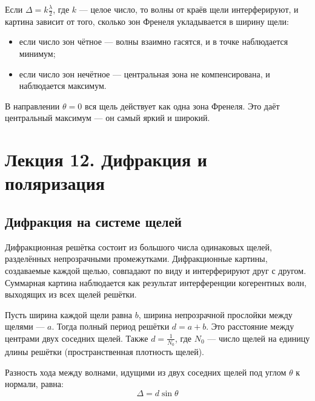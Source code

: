 \documentclass[12pt]{article}
\begin{document}
Если $\Delta = k\frac{\lambda}{2}$, где $k$ — целое число, то волны от краёв щели интерферируют, и картина зависит от того, сколько зон Френеля укладывается в ширину щели:
\begin{itemize}
  \item если число зон чётное — волны взаимно гасятся, и в точке наблюдается минимум;
  \item если число зон нечётное — центральная зона не компенсирована, и наблюдается максимум.
\end{itemize}

В направлении $\theta = 0$ вся щель действует как одна зона Френеля. Это даёт центральный максимум — он самый яркий и широкий.







\section{Лекция 12. Дифракция и поляризация}

\subsection{Дифракция на системе щелей}

Дифракционная решётка состоит из большого числа одинаковых щелей, разделённых непрозрачными промежутками. Дифракционные картины, создаваемые каждой щелью, совпадают по виду и интерферируют друг с другом. Суммарная картина наблюдается как результат интерференции когерентных волн, выходящих из всех щелей решётки.

Пусть ширина каждой щели равна $b$, ширина непрозрачной прослойки между щелями — $a$. Тогда полный период решётки $d = a + b$. Это расстояние между центрами двух соседних щелей. Также $d = \frac{1}{N_0}$, где $N_0$ — число щелей на единицу длины решётки (пространственная плотность щелей).

Разность хода между волнами, идущими из двух соседних щелей под углом $\theta$ к нормали, равна:
\[
\Delta = d \sin \theta
\]
\end{document}

